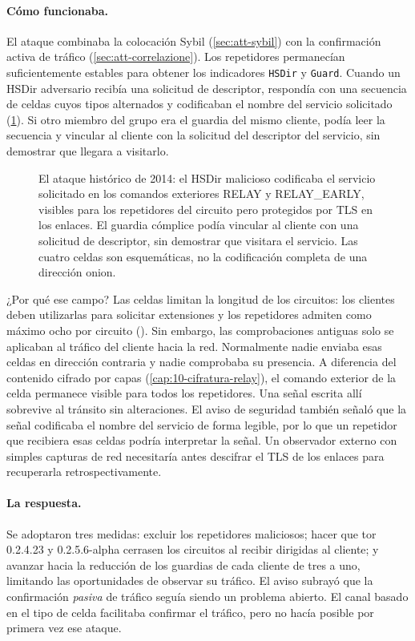 \paragraph{Cómo funcionaba.} El ataque combinaba la colocación Sybil (\cref{sec:att-sybil}) con la confirmación activa de tráfico (\cref{sec:att-correlazione}). Los repetidores permanecían suficientemente estables para obtener los indicadores \texttt{HSDir} y \texttt{Guard}. Cuando un HSDir adversario recibía una solicitud de descriptor, respondía con una secuencia de celdas cuyos tipos alternados  y  codificaban el nombre del servicio solicitado (\cref{fig:relayearly}). Si otro miembro del grupo era el guardia del mismo cliente, podía leer la secuencia y vincular al cliente con la solicitud del descriptor del servicio, sin demostrar que llegara a visitarlo.

\begin{figure}[htbp]
\centering

\caption{El ataque histórico de 2014: el HSDir malicioso codificaba el servicio solicitado en los comandos exteriores RELAY y RELAY\_EARLY, visibles para los repetidores del circuito pero protegidos por TLS en los enlaces. El guardia cómplice podía vincular al cliente con una solicitud de descriptor, sin demostrar que visitara el servicio. Las cuatro celdas son esquemáticas, no la codificación completa de una dirección onion.}
\label{fig:relayearly}
\end{figure}

¿Por qué ese campo? Las celdas  limitan la longitud de los circuitos: los clientes deben utilizarlas para solicitar extensiones y los repetidores admiten como máximo ocho por circuito (). Sin embargo, las comprobaciones antiguas solo se aplicaban al tráfico del cliente hacia la red. Normalmente nadie enviaba esas celdas en dirección contraria y nadie comprobaba su presencia. A diferencia del contenido cifrado por capas (\cref{cap:10-cifratura-relay}), el comando exterior de la celda permanece visible para todos los repetidores. Una señal escrita allí sobrevive al tránsito sin alteraciones. El aviso de seguridad también señaló que la señal codificaba el nombre del servicio de forma legible, por lo que un repetidor que recibiera esas celdas podría interpretar la señal. Un observador externo con simples capturas de red necesitaría antes descifrar el TLS de los enlaces para recuperarla retrospectivamente.

\paragraph{La respuesta.} Se adoptaron tres medidas: excluir los repetidores maliciosos; hacer que tor 0.2.4.23 y 0.2.5.6-alpha cerrasen los circuitos al recibir  dirigidas al cliente; y avanzar hacia la reducción de los guardias de cada cliente de tres a uno, limitando las oportunidades de observar su tráfico. El aviso subrayó que la confirmación \emph{pasiva} de tráfico seguía siendo un problema abierto. El canal basado en el tipo de celda facilitaba confirmar el tráfico, pero no hacía posible por primera vez ese ataque.

